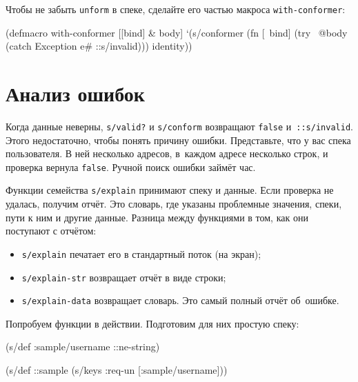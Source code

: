 Чтобы не забыть \verb|unform| в спеке, сделайте его частью макроса
\verb|with-conformer|:

\begin{english}
  \begin{clojure}
(defmacro with-conformer
  [[bind] & body]
  `(s/conformer
    (fn [~bind]
      (try
        ~@body
        (catch Exception e#
          ::s/invalid)))
    identity))
  \end{clojure}
\end{english}

\section{Анализ ошибок}


\label{spec-explain}

Когда данные неверны, \verb|s/valid?| и \verb|s/conform| возвращают \verb|false|
и~\verb|::s/invalid|. Этого недостаточно, чтобы понять причину
ошибки. Представьте, что у вас спека пользователя. В ней несколько адресов,
в~каждом адресе несколько строк, и проверка вернула \verb|false|. Ручной поиск
ошибки займёт час.

Функции семейства \verb|s/explain| принимают спеку и данные. Если проверка не
удалась, получим отчёт. Это словарь, где указаны проблемные значения, спеки,
пути к ним и другие данные. Разница между функциями в том, как они поступают с
отчётом:

\begin{itemize}


\item
  \verb|s/explain| печатает его в стандартный поток (на экран);

\item
  \verb|s/explain-str| возвращает отчёт в виде строки;

\item
  \verb|s/explain-data| возвращает словарь. Это самый полный отчёт об~ошибке.

\end{itemize}

Попробуем функции в действии. Подготовим для них простую спеку:

\begin{english}
  \begin{clojure}
(s/def :sample/username ::ne-string)

(s/def ::sample
  (s/keys :req-un [:sample/username]))
  \end{clojure}
\end{english}

